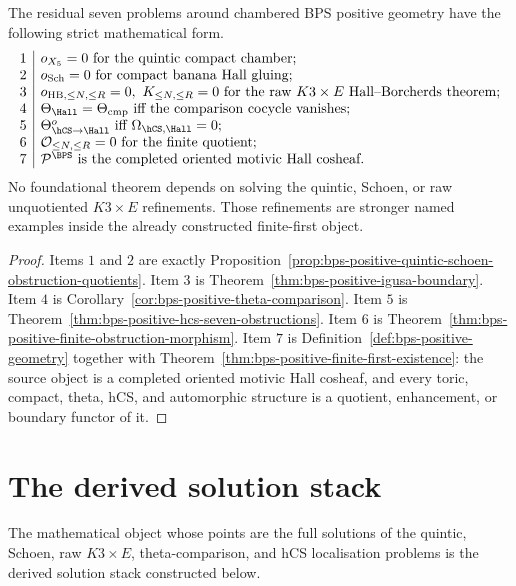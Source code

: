 \begin{theorem}
\label{thm:bps-positive-seven-boundary-problems}
The residual seven problems around chambered BPS positive geometry have
the following strict mathematical form.
\[
\begin{array}{c|l}
1 & o_{X_5}=0
 \text{ for the quintic compact chamber;}\\
2 & o_{\mathrm{Sch}}=0
 \text{ for compact banana Hall gluing;}\\
3 & o_{\mathrm{HB},\leq N,\leq R}=0,\ K_{\leq N,\leq R}=0
 \text{ for the raw }K3\times E\text{ Hall--Borcherds theorem;}\\
4 & \Theta_{\Hall}=\Theta_{\mathrm{cmp}}
 \text{ iff the comparison cocycle vanishes;}\\
5 & \Theta^{o}_{\hCS\to\Hall}
 \text{ iff }\Omega_{\hCS,\Hall}=0;\\
6 & \mathcal O_{\leq N,\leq R}=0
 \text{ for the finite quotient;}\\
7 & \mathcal P^{\BPS}
 \text{ is the completed oriented motivic Hall cosheaf.}
\end{array}
\]
No foundational theorem depends on solving the quintic, Schoen, or raw
unquotiented \(K3\times E\) refinements. Those refinements are stronger
named examples inside the already constructed finite-first object.
\end{theorem}

\begin{proof}
Items \(1\) and \(2\) are exactly
Proposition~\ref{prop:bps-positive-quintic-schoen-obstruction-quotients}.
Item \(3\) is Theorem~\ref{thm:bps-positive-igusa-boundary}. Item \(4\)
is Corollary~\ref{cor:bps-positive-theta-comparison}. Item \(5\) is
Theorem~\ref{thm:bps-positive-hcs-seven-obstructions}. Item \(6\) is
Theorem~\ref{thm:bps-positive-finite-obstruction-morphism}. Item \(7\)
is Definition~\ref{def:bps-positive-geometry} together with
Theorem~\ref{thm:bps-positive-finite-first-existence}: the source
object is a completed oriented motivic Hall cosheaf, and every toric,
compact, theta, hCS, and automorphic structure is a quotient,
enhancement, or boundary functor of it.
\end{proof}

\section{The derived solution stack}

\noindent
The mathematical object whose points are the full solutions of the
quintic, Schoen, raw \(K3 \times E\), theta-comparison, and hCS
localisation problems is the derived solution stack constructed below.


